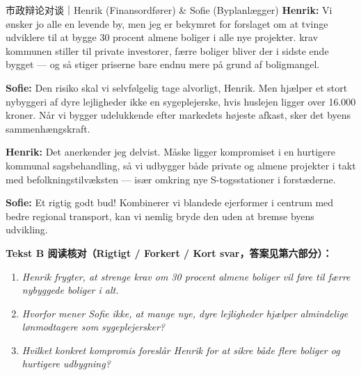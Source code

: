 \begin{emailbox}{市政辩论对谈｜Henrik (Finansordfører) \& Sofie (Byplanlægger)}
\textbf{Henrik:} Vi ønsker jo alle en levende by, men jeg er bekymret for forslaget om at tvinge udviklere til at bygge 30 procent almene boliger i alle nye projekter.  krav kommunen stiller til private investorer,  færre boliger bliver der i sidste ende bygget --- og så stiger priserne bare endnu mere på grund af boligmangel.

\textbf{Sofie:} Den risiko skal vi selvfølgelig tage alvorligt, Henrik. Men  hjælper et stort nybyggeri af dyre lejligheder ikke en sygeplejerske, hvis huslejen ligger over 16.000 kroner. Når vi bygger udelukkende efter markedets højeste afkast, sker det  byens sammenhængskraft.

\textbf{Henrik:} Det anerkender jeg delvist. Måske ligger kompromiset i en hurtigere kommunal sagsbehandling, så vi udbygger både private og almene projekter i takt med befolkningstilvæksten --- især omkring nye S-togsstationer i forstæderne.

\textbf{Sofie:} Et rigtig godt bud! Kombinerer vi blandede ejerformer i centrum med bedre regional transport, kan vi nemlig bryde den  uden at bremse byens udvikling.
\end{emailbox}

\textbf{Tekst B 阅读核对（Rigtigt / Forkert / Kort svar，答案见第六部分）：}
\begin{enumerate}
  \item \textit{Henrik frygter, at strenge krav om 30 procent almene boliger vil føre til færre nybyggede boliger i alt.} \underline{\hspace{2.2cm}}
  \item \textit{Hvorfor mener Sofie ikke, at mange nye, dyre lejligheder hjælper almindelige lønmodtagere som sygeplejersker?} \underline{\hspace{2.2cm}}
  \item \textit{Hvilket konkret kompromis foreslår Henrik for at sikre både flere boliger og hurtigere udbygning?} \underline{\hspace{2.2cm}}
\end{enumerate}

